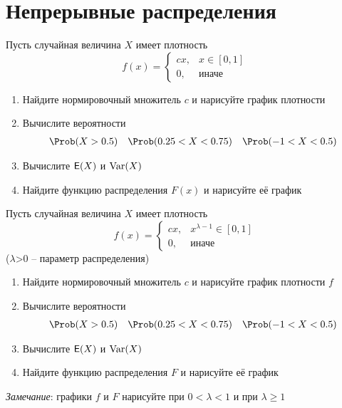
\section{Непрерывные распределения}

\begin{exercise}
Пусть случайная величина \(X\) имеет плотность
\[
	f(x)=\begin{cases}
	cx, & x\in[0,1] \\ 0, & \text{иначе}
	\end{cases}
\]
\begin{enumerate}
	\item Найдите нормировочный множитель \(c\) и нарисуйте график плотности
	\item Вычислите вероятности
	\begin{align*}
		\Prob&(X>0.5) & \Prob&(0.25<X<0.75) & \Prob(-1<X<0.5)
	\end{align*}
	\item Вычислите \({\mathsf E}(X)\) и \(\operatorname{Var}(X)\)
	\item Найдите функцию распределения \(F(x)\) и нарисуйте её график
\end{enumerate}
\end{exercise}

\begin{exercise}
Пусть случайная величина \(X\) имеет плотность 
\[
	f(x)=\begin{cases}
	cx, & x^{\lambda-1}\in[0,1] \\ 0, & \text{иначе}
	\end{cases}
\]
(\(\lambda\)>0 -- параметр распределения)
\begin{enumerate}
	\item Найдите нормировочный множитель \(c\) и нарисуйте график плотности \(f\)
	\item Вычислите вероятности
	\begin{align*}
		\Prob&(X>0.5) & \Prob&(0.25<X<0.75) & \Prob(-1<X<0.5)
	\end{align*}
	\item Вычислите \({\mathsf E}(X)\) и \(\operatorname{Var}(X)\)
	\item Найдите функцию распределения \(F\) и нарисуйте её график
\end{enumerate}
\textit{Замечание}: графики \(f\) и  \(F\) нарисуйте при \(0<\lambda<1\) и при \(\lambda\geq 1\)
\end{exercise}

